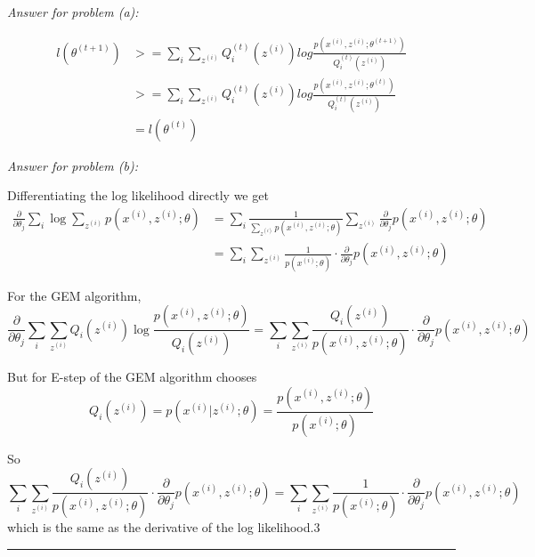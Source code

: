 \documentclass[twoside]{article}
\newenvironment{problem}[2][Problem]{\begin{trivlist}
		\item[\hskip \labelsep {\bfseries #1}\hskip \labelsep {\bfseries #2.}]}{\end{trivlist}}
\newenvironment{solution}{{\bf Solution:}}{\hfill\rule{2mm}{2mm}}
\begin{document}
\begin{problem}{3}
\end{problem} 
\begin{solution}

\emph{Answer for problem (a):}

\begin{align*}
\mathit{l}(\theta^{(t+1)}) &>= \sum_i \sum_{z^{(i)}}Q_i^{(t)}(z^{(i)})log\frac{p(x^{(i)},z^{(i)};\theta^{(t+1)})}{Q_i^{(t)}(z^{(i)})} \\
&>= \sum_i \sum_{z^{(i)}}Q_i^{(t)}(z^{(i)})log\frac{p(x^{(i)},z^{(i)};\theta^{(t)})}{Q_i^{(t)}(z^{(i)})} \\
&=\mathit{l}(\theta^{(t)})
\end{align*}

\emph{Answer for problem (b):}

Differentiating the log likelihood directly we get
\begin{align*}
\frac{\partial}{\partial\theta_j}\sum_i\log\sum_{z^{(i)}}p(x^{(i)},z^{(i)};\theta) &= \sum_i\frac{1}{\sum_{z^{(i)}}p(x^{(i)},z^{(i)};\theta)}\sum_{z^{(i)}}\frac{\partial}{\partial\theta_j}p(x^{(i)},z^{(i)};\theta) \\
&= \sum_i\sum_{z^{(i)}}\frac{1}{p(x^{(i)};\theta)}\cdot\frac{\partial}{\partial\theta_j}p(x^{(i)},z^{(i)};\theta)
\end{align*}

For the GEM algorithm,
$$
\frac{\partial}{\partial\theta_j}\sum_i\sum_{z^{(i)}}Q_i(z^{(i)})\log\frac{p(x^{(i)},z^{(i)};\theta)}{Q_i(z^{(i)})} = \sum_i\sum_{z^{(i)}}\frac{Q_i(z^{(i)})}{p(x^{(i)},z^{(i)};\theta)}\cdot\frac{\partial}{\partial\theta_j}p(x^{(i)},z^{(i)};\theta)
$$

But for E-step of the GEM algorithm chooses
$$
Q_i(z^{(i)}) = p(x^{(i)}|z^{(i)};\theta) = \frac{p(x^{(i)},z^{(i)};\theta)}{p(x^{(i)};\theta)}
$$

So
$$
\sum_i\sum_{z^{(i)}}\frac{Q_i(z^{(i)})}{p(x^{(i)},z^{(i)};\theta)}\cdot\frac{\partial}{\partial\theta_j}p(x^{(i)},z^{(i)};\theta) = \sum_i\sum_{z^{(i)}}\frac{1}{p(x^{(i)};\theta)}\cdot\frac{\partial}{\partial\theta_j}p(x^{(i)},z^{(i)};\theta)
$$
which is the same as the derivative of the log likelihood.3
\end{solution}
\end{document}
